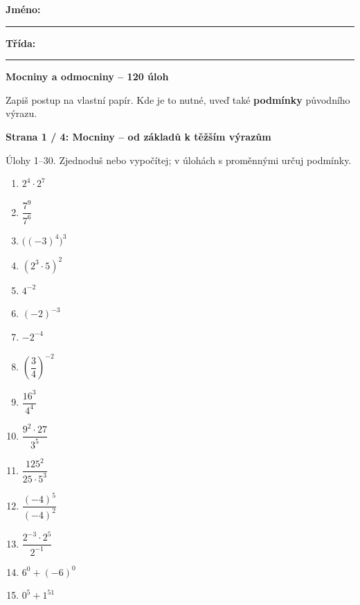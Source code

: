 \documentclass[11pt,a4paper]{article}
\newcommand{\studenthead}[2]{%
  {\large\bfseries #1}\par\vspace{1mm}
  {\footnotesize #2}\par\vspace{2.4mm}}
\begin{document}
\noindent\textbf{Jméno:}\enspace\rule{72mm}{.3pt}\hfill\textbf{Třída:}\enspace\rule{21mm}{.3pt}
\vspace{2mm}
\begin{center}{\LARGE\bfseries Mocniny a odmocniny -- 120 úloh}\end{center}
\noindent\small Zapiš postup na vlastní papír. Kde je to nutné, uveď také \textbf{podmínky} původního výrazu.\par
\vspace{3mm}
\studenthead{Strana 1 / 4: Mocniny -- od základů k těžším výrazům}{Úlohy 1--30. Zjednoduš nebo vypočítej; v úlohách s proměnnými určuj podmínky.}
\noindent\begin{minipage}[t]{.49\textwidth}
\begin{enumerate}[label=\textbf{\arabic*.},leftmargin=8mm,itemsep=11pt,topsep=3pt,start=1]
\normalsize
\item $2^4\cdot2^7$
\item $\dfrac{7^9}{7^6}$
\item $\bigl((-3)^4\bigr)^3$
\item $(2^3\cdot5)^2$
\item $4^{-2}$
\item $(-2)^{-3}$
\item $-2^{-4}$
\item $\left(\dfrac34\right)^{-2}$
\item $\dfrac{16^3}{4^4}$
\item $\dfrac{9^2\cdot27}{3^5}$
\item $\dfrac{125^2}{25\cdot5^3}$
\item $\dfrac{(-4)^5}{(-4)^2}$
\item $\dfrac{2^{-3}\cdot2^5}{2^{-1}}$
\item $6^0+(-6)^0$
\item $0^5+1^{51}$
\end{enumerate}
\end{minipage}\hfill
\end{document}
